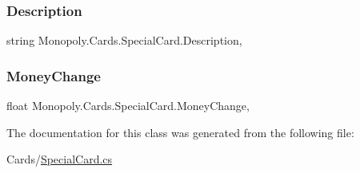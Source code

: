 \subsubsection{\texorpdfstring{Description}{Description}}
{\footnotesize\ttfamily string Monopoly.\+Cards.\+Special\+Card.\+Description\hspace{0.3cm}{\ttfamily [get]}, {}}

\mbox{\label{class_monopoly_1_1_cards_1_1_special_card_ab81aa9650e34745aa35b313730a8c0c4}} 
\subsubsection{\texorpdfstring{Money\+Change}{MoneyChange}}
{\footnotesize\ttfamily float Monopoly.\+Cards.\+Special\+Card.\+Money\+Change\hspace{0.3cm}{\ttfamily [get]}, {}}



The documentation for this class was generated from the following file\+:\begin{DoxyCompactItemize}
\item 
Cards/\mbox{\hyperlink{_special_card_8cs}{Special\+Card.\+cs}}\end{DoxyCompactItemize}
